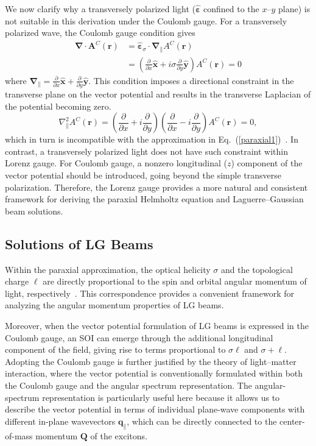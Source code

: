 We now clarify why a transversely polarized light ($\hat{\boldsymbol{\varepsilon}}$ confined to the $x$--$y$ plane) is not suitable in this derivation under the Coulomb gauge. For a transversely polarized wave, the Coulomb gauge condition gives
\begin{align} 
\boldsymbol{\nabla} \cdot \boldsymbol{A}^C(\boldsymbol{r})
&=
\hat{\boldsymbol{\varepsilon}}_{\sigma} \cdot \boldsymbol{\nabla}_\parallel A^C(\boldsymbol{r}) \\
&=
\left( \frac{\partial}{\partial x}\hat{\boldsymbol{x}} + i \sigma \frac{\partial}{\partial y}\hat{\boldsymbol{y}} \right)A^C(\boldsymbol{r}) = 0
\label{Vio}
\end{align}
where $\boldsymbol{\nabla}_\parallel = \frac{\partial}{\partial x}\hat{\boldsymbol{x}} + \frac{\partial}{\partial y}\hat{\boldsymbol{y}}$. This condition imposes a directional constraint in the transverse plane on the vector potential and results in the transverse Laplacian of the potential becoming zero.
\begin{equation}
\nabla^2_\parallel A^C(\boldsymbol{r})
=
\left( \frac{\partial}{\partial x} + i \frac{\partial}{\partial y} \right)
\left( \frac{\partial}{\partial x} - i \frac{\partial}{\partial y} \right)
A^C(\boldsymbol{r})
= 0,
\end{equation}
which in turn is incompatible with the approximation in Eq.~(\ref{paraxial1})~\cite{andrews2012angular}. In contrast, a transversely polarized light does not  have such constraint within Lorenz gauge. For Coulomb gauge, a nonzero longitudinal ($z$) component of the vector potential should be introduced, going beyond the simple transverse polarization. Therefore, the Lorenz gauge provides a more natural and consistent framework for deriving the paraxial Helmholtz equation and Laguerre--Gaussian beam solutions.
%
%
%
%
%
%
\subsection{Solutions of LG Beams}
Within the paraxial approximation, the optical helicity $\sigma$ and the topological charge $\ell$ are directly proportional to the spin and orbital angular momentum of light, respectively~\cite{bliokh2015transverse, barnett1994orbital}. This correspondence provides a convenient framework for analyzing the angular momentum properties of LG beams. 

Moreover, when the vector potential formulation of LG beams is expressed in the Coulomb gauge, an SOI can emerge through the additional longitudinal component of the field, giving rise to terms proportional to $\sigma \ell$ and $\sigma + \ell$. Adopting the Coulomb gauge is further justified by the theory of light–matter interaction, where the vector potential is conventionally formulated within both the Coulomb gauge and the angular spectrum representation. The angular-spectrum representation is particularly useful here because it allows us to describe the vector potential in terms of individual plane-wave components with different in-plane wavevectors $\boldsymbol q_\parallel$, which can be directly connected to the center-of-mass momentum $\boldsymbol Q$ of the excitons.

